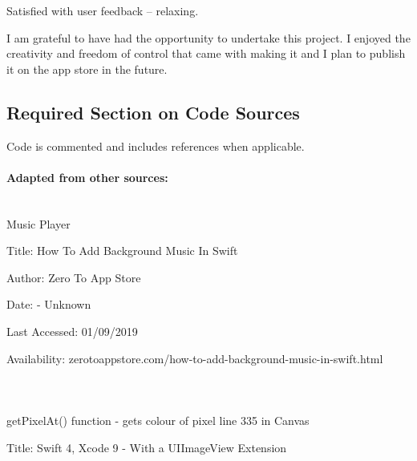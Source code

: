 \documentclass[11pt]{article}
\begin{document}
            Satisfied with user feedback -- relaxing.


            I am grateful to have had the opportunity to undertake this project. I enjoyed the creativity and freedom of control that came with making it and I plan to publish it on the app store in the future.
        
\newpage
\let\Section\section 
\def\section*#1{\Section{#1}}  

    
    
    \newpage
      \subsection{Required Section on Code Sources}
            
            Code is commented and includes references when applicable. 
            
            \paragraph{Adapted from other sources:\\\\}
           
            Music Player 
            
            Title: How To Add Background Music In Swift
            
            Author: Zero To App Store
            
            Date: - Unknown
            
            Last Accessed: 01/09/2019
            
            Availability: zerotoappstore.com/how-to-add-background-music-in-swift.html

            \paragraph{\\}
            
            getPixelAt() function - gets colour of pixel line 335 in Canvas
            
            Title: Swift 4, Xcode 9 - With a UIImageView Extension
            
\end{document}
